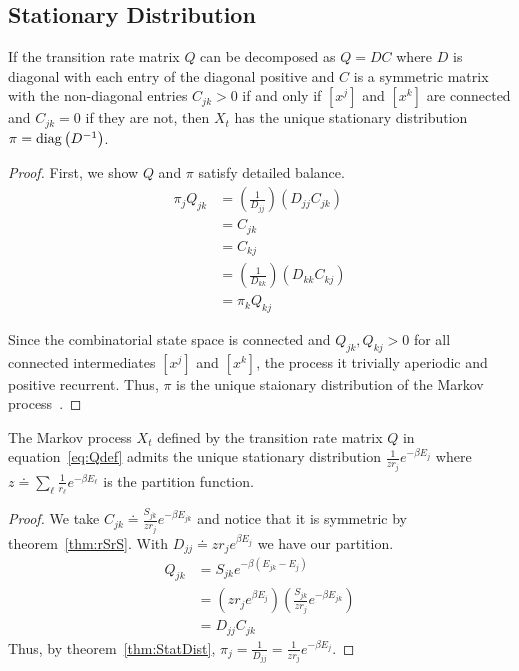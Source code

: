 \subsection{Stationary Distribution}

\begin{mythm}
\label{thm:StatDist}
If the transition rate matrix $Q$ can be decomposed as $Q = DC$ where $D$ is diagonal with each entry of the diagonal positive and $C$ is a symmetric matrix with the non-diagonal entries $C_{jk} > 0$ if and only if $[x^j]$ and $[x^k]$ are connected and $C_{jk} = 0$ if they are not, then $X_t$ has the unique stationary distribution $\pi = \operatorname{diag}\left(D^{-1}\right)$.         
\end{mythm}
\begin{proof}
First, we show $Q$ and $\pi$ satisfy detailed balance.
\begin{align}
\pi_jQ_{jk} &= \left(\frac{1}{D_{jj}}\right)\left(D_{jj}C_{jk}\right) \\
&= C_{jk} \\
&= C_{kj} \\
&= \left(\frac{1}{D_{kk}}\right)\left(D_{kk}C_{kj}\right) \\
                    &= \pi_kQ_{kj}
\end{align}

Since the combinatorial state space is connected and $Q_{jk}, Q_{kj} > 0$ for all connected intermediates $[x^j]$ and $[x^k]$, the process it trivially aperiodic and positive recurrent. Thus, $\pi$ is the unique staionary distribution of the Markov process~\cite{Norris1998}. 
\end{proof}


\begin{mythm}
\label{thm:E}
The Markov process $X_t$ defined by the transition rate matrix  $Q$ in equation~\ref{eq:Qdef} admits the unique stationary distribution $\frac{1}{zr_j}e^{-\beta E_j}$ where $z \doteq \sum_\ell \frac{1}{r_\ell}e^{-\beta E_\ell}$ is the partition function. 
\end{mythm}
\begin{proof}
We take $C_{jk} \doteq \frac{S_{jk}}{zr_j}e^{-\beta E_{jk}}$ and notice that it is symmetric by theorem~\ref{thm:rSrS}. With $D_{jj} \doteq zr_je^{\beta E_j}$ we have our partition.  
\begin{align}
Q_{jk} &= S_{jk}e^{-\beta\left(E_{jk} - E_j\right)} \\
       &= \left(zr_je^{\beta E_j}\right) \left(\frac{S_{jk}}{zr_j}e^{-\beta E_{jk}}\right) \\
       &= D_{jj}C_{jk}    
\end{align}
Thus, by theorem~\ref{thm:StatDist},  $\pi_j = \frac{1}{D_{jj}} = \frac{1}{zr_j}e^{-\beta E_j}$.
\end{proof}


